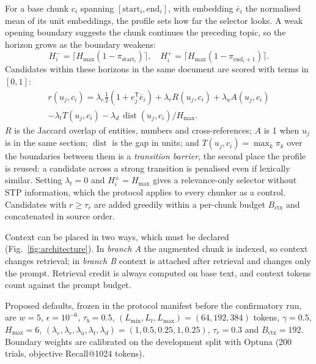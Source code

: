 \documentclass[conference,a4paper]{IEEEtran}
\DeclareMathOperator{\dist}{dist}
\newcommand{\ctx}{\mathrm{ctx}}
\begin{document}
For a base chunk $c_i$ spanning $[\mathrm{start}_i,\mathrm{end}_i]$, with embedding $\bar e_i$ the normalised mean of its unit embeddings, the profile sets how far the selector looks. A weak opening boundary suggests the chunk continues the preceding topic, so the horizon grows as the boundary weakens:
\begin{equation}
H_i^- = \lceil H_{\max}(1-\pi_{\mathrm{start}_i})\rceil,\quad H_i^+ = \lceil H_{\max}(1-\pi_{\mathrm{end}_i+1})\rceil.
\label{eq:horizon}
\end{equation}
Candidates within these horizons in the same document are scored with terms in $[0,1]$:
\begin{multline}
r(u_j,c_i) = \lambda_e\tfrac12(1+e_j^{\mathsf T}\bar e_i) + \lambda_r R(u_j,c_i) + \lambda_a A(u_j,c_i)\\
- \lambda_t T(u_j,c_i) - \lambda_d\,\dist(u_j,c_i)/H_{\max}.
\label{eq:contextscore}
\end{multline}
$R$ is the Jaccard overlap of entities, numbers and cross-references; $A$ is 1 when $u_j$ is in the same section; $\dist$ is the gap in units; and $T(u_j,c_i)=\max_k\pi_k$ over the boundaries between them is a \emph{transition barrier}, the second place the profile is reused: a candidate across a strong transition is penalised even if lexically similar. Setting $\lambda_t=0$ and $H_i^\pm=H_{\max}$ gives a relevance-only selector without STP information, which the protocol applies to every chunker as a control. Candidates with $r\ge\tau_r$ are added greedily within a per-chunk budget $B_{\ctx}$ and concatenated in source order.

Context can be placed in two ways, which must be declared (Fig.~\ref{fig:architecture}). In \emph{branch A} the augmented chunk is indexed, so context changes retrieval; in \emph{branch B} context is attached after retrieval and changes only the prompt. Retrieval credit is always computed on base text, and context tokens count against the prompt budget.

Proposed defaults, frozen in the protocol manifest before the confirmatory run, are $w=5$, $\epsilon=10^{-6}$, $\tau_b=0.5$, $(L_{\min},L_t,L_{\max})=(64,192,384)$ tokens, $\gamma=0.5$, $H_{\max}=6$, $(\lambda_e,\lambda_r,\lambda_a,\lambda_t,\lambda_d)=(1,0.5,0.25,1,0.25)$, $\tau_r=0.3$ and $B_{\ctx}=192$. Boundary weights are calibrated on the development split with Optuna \cite{akiba2019optuna} (200 trials, objective Recall@1024 tokens).


\end{document}
